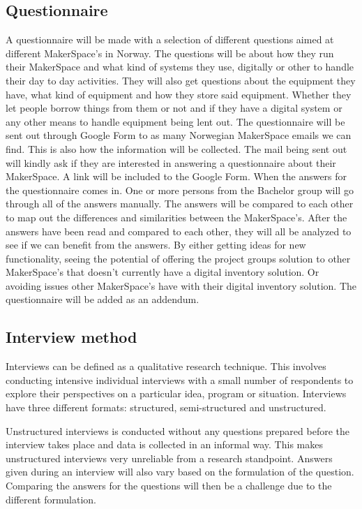  \subsection{Questionnaire}
 A questionnaire will be made with a selection of different questions aimed at different MakerSpace's in Norway. The questions will be about how they run their MakerSpace and what kind of systems they use, digitally or other to handle their day to day activities. They will also get questions about the equipment they have, what kind of equipment and how they store said equipment. Whether they let people borrow things from them or not and if they have a digital system or any other means to handle equipment being lent out. 
 The questionnaire will be sent out through Google Form to as many Norwegian MakerSpace emails we can find. This is also how the information will be collected. The mail being sent out will kindly ask if they are interested in answering a questionnaire about their MakerSpace. A link will be included to the Google Form. 
 When the answers for the questionnaire comes in. One or more persons from the Bachelor group will go through all of the answers manually. The answers will be compared to each other to map out the differences and similarities between the MakerSpace's. After the answers have been read and compared to each other, they will all be analyzed to see if we can benefit from the answers. By either getting ideas for new functionality, seeing the potential of offering the project groups solution to other MakerSpace's that doesn't currently have a digital inventory solution. Or avoiding issues other MakerSpace's have with their digital inventory solution. The questionnaire will be added as an addendum.          
 
 \subsection{Interview method}
 
 Interviews can be defined as a qualitative research technique. This involves conducting intensive individual interviews with a small number of respondents to explore their perspectives on a particular idea, program or situation.\cite{Interview-Methods} Interviews have three different formats: structured, semi-structured and unstructured.

Unstructured interviews is conducted without any questions prepared before the interview takes place and data is collected in an informal way. This makes unstructured interviews very unreliable from a research standpoint. Answers given during an interview will also vary based on the formulation of the question. Comparing the answers for the questions will then be a challenge due to the different formulation.


